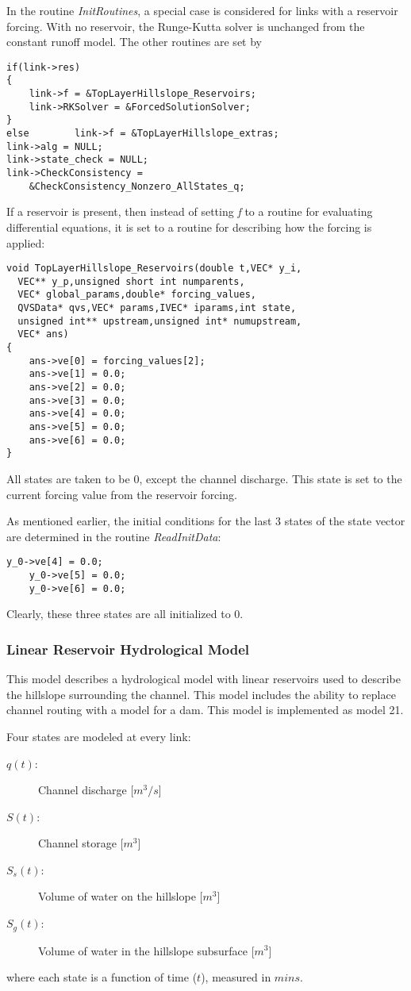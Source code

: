 \documentclass[12pt]{article}
\begin{document}
In the routine \emph{InitRoutines}, a special case is considered for links with a reservoir forcing. With no reservoir, the Runge-Kutta solver is unchanged from the constant runoff model. The other routines are set by
\begin{lstlisting}[style=CStyle]
if(link->res)
{
	link->f = &TopLayerHillslope_Reservoirs;
	link->RKSolver = &ForcedSolutionSolver;
}
else		link->f = &TopLayerHillslope_extras;
link->alg = NULL;
link->state_check = NULL;
link->CheckConsistency = 
	&CheckConsistency_Nonzero_AllStates_q;
\end{lstlisting}
If a reservoir is present, then instead of setting \emph{f} to a routine for evaluating differential equations, it is set to a routine for describing how the forcing is applied:
\begin{lstlisting}[style=CStyle]
void TopLayerHillslope_Reservoirs(double t,VEC* y_i,
  VEC** y_p,unsigned short int numparents,
  VEC* global_params,double* forcing_values,
  QVSData* qvs,VEC* params,IVEC* iparams,int state,
  unsigned int** upstream,unsigned int* numupstream,
  VEC* ans)
{
	ans->ve[0] = forcing_values[2];
	ans->ve[1] = 0.0;
	ans->ve[2] = 0.0;
	ans->ve[3] = 0.0;
	ans->ve[4] = 0.0;
	ans->ve[5] = 0.0;
	ans->ve[6] = 0.0;
}
\end{lstlisting}
All states are taken to be 0, except the channel discharge. This state is set to the current forcing value from the reservoir forcing.

As mentioned earlier, the initial conditions for the last 3 states of the state vector are determined in the routine \emph{ReadInitData}:
\begin{lstlisting}[style=CStyle]
    y_0->ve[4] = 0.0;
    y_0->ve[5] = 0.0;
    y_0->ve[6] = 0.0;
\end{lstlisting}
Clearly, these three states are all initialized to 0.


\subsubsection{Linear Reservoir Hydrological Model} \label{sec: linear reservoir hydrological model}

This model describes a hydrological model with linear reservoirs used to describe the hillslope surrounding the channel. This model includes the ability to replace channel routing with a model for a dam. This model is implemented as model 21.

Four states are modeled at every link:
\begin{description}
 \item[$q(t)$:] Channel discharge [$m^3/s$]
 \item[$S(t)$:] Channel storage [$m^3$]
 \item[$S_s(t)$:] Volume of water on the hillslope [$m^3$]
 \item[$S_g(t)$:] Volume of water in the hillslope subsurface [$m^3$]
\end{description}
where each state is a function of time ($t$), measured in $mins$.
\end{document}

